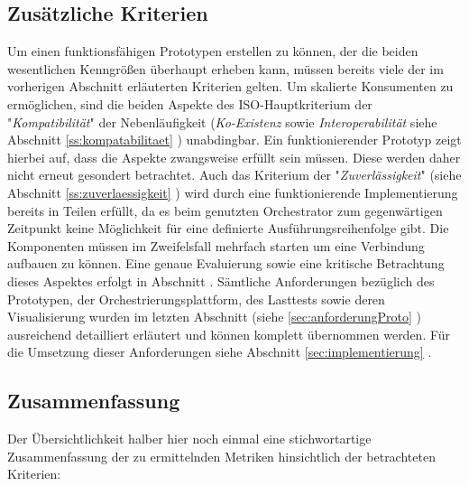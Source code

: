\subsection{Zusätzliche Kriterien}
Um einen funktionsfähigen Prototypen erstellen zu können, der die beiden wesentlichen Kenngrößen überhaupt erheben kann, müssen bereits viele der im vorherigen Abschnitt erläuterten Kriterien gelten. Um skalierte Konsumenten zu ermöglichen, sind die beiden Aspekte des ISO-Hauptkriterium der "\emph{Kompatibilität}" der Nebenläufigkeit (\emph{Ko-Existenz} sowie \emph{Interoperabilität} siehe Abschnitt \ref{ss:kompatabilitaet} ) unabdingbar. Ein funktionierender Prototyp zeigt hierbei auf, dass die Aspekte zwangsweise erfüllt sein müssen. Diese werden daher nicht erneut gesondert betrachtet. Auch das Kriterium der "\emph{Zuverlässigkeit}" (siehe Abschnitt \ref{ss:zuverlaessigkeit} ) wird durch eine funktionierende Implementierung bereits in Teilen erfüllt, da es beim genutzten Orchestrator zum gegenwärtigen Zeitpunkt keine Möglichkeit für eine definierte Ausführungsreihenfolge gibt. Die Komponenten müssen im Zweifelsfall mehrfach starten um eine Verbindung aufbauen zu können. Eine genaue Evaluierung sowie eine kritische Betrachtung dieses Aspektes erfolgt in Abschnitt . Sämtliche Anforderungen bezüglich des Prototypen, der Orchestrierungsplattform, des Lasttests sowie deren Visualisierung wurden im letzten Abschnitt (siehe \ref{sec:anforderungProto} ) ausreichend detailliert erläutert und können komplett übernommen werden. Für die Umsetzung dieser Anforderungen siehe Abschnitt \ref{sec:implementierung} .

\subsection{Zusammenfassung}
Der Übersichtlichkeit halber hier noch einmal eine stichwortartige Zusammenfassung der zu ermittelnden Metriken hinsichtlich der betrachteten Kriterien:


